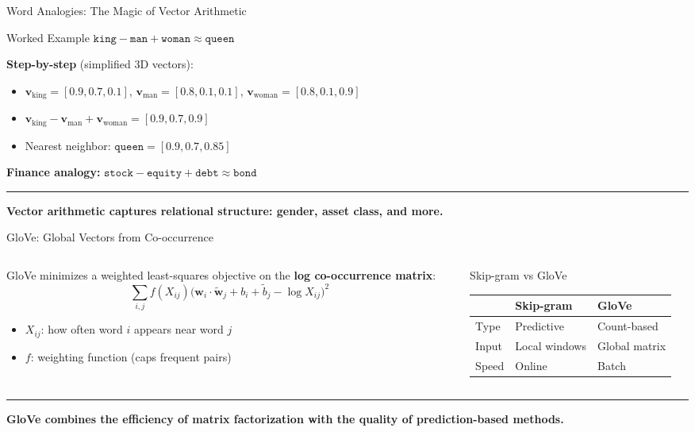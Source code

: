 \documentclass[8pt,aspectratio=169]{beamer}
\newcommand{\bottomnote}[1]{%
\vfill
\vspace{-2mm}
\textcolor{mllavender2}{\rule{\textwidth}{0.4pt}}
\vspace{1mm}
\footnotesize
\textbf{#1}
}
\newenvironment{compactlist}{%
  \begin{itemize}%
    \setlength{\itemsep}{2pt}%
    \setlength{\parskip}{0pt}%
    \setlength{\parsep}{0pt}%
}{%
  \end{itemize}%
}
\begin{document}
\begin{frame}{Word Analogies: The Magic of Vector Arithmetic}
\begin{block}{Worked Example}
$\texttt{king} - \texttt{man} + \texttt{woman} \approx \texttt{queen}$
\end{block}

\vspace{4pt}
\textbf{Step-by-step} (simplified 3D vectors):

\begin{compactlist}
  \item $\mathbf{v}_{\text{king}} = [0.9, 0.7, 0.1]$, \;
        $\mathbf{v}_{\text{man}} = [0.8, 0.1, 0.1]$, \;
        $\mathbf{v}_{\text{woman}} = [0.8, 0.1, 0.9]$
  \item $\mathbf{v}_{\text{king}} - \mathbf{v}_{\text{man}} + \mathbf{v}_{\text{woman}} = [0.9, 0.7, 0.9]$
  \item Nearest neighbor: $\texttt{queen} = [0.9, 0.7, 0.85]$ \checkmark
\end{compactlist}

\vspace{4pt}
\textbf{Finance analogy:} $\texttt{stock} - \texttt{equity} + \texttt{debt} \approx \texttt{bond}$

\bottomnote{Vector arithmetic captures relational structure: gender, asset class, and more.}
\end{frame}

\begin{frame}{GloVe: Global Vectors from Co-occurrence}
\begin{columns}[T]
\begin{column}{0.48\textwidth}
GloVe minimizes a weighted least-squares objective on the
\textbf{log co-occurrence matrix}:
\[
  \sum_{i,j} f(X_{ij})\bigl(\mathbf{w}_i \!\cdot\! \tilde{\mathbf{w}}_j + b_i + \tilde{b}_j - \log X_{ij}\bigr)^2
\]
\begin{compactlist}
  \item $X_{ij}$: how often word $i$ appears near word $j$
  \item $f$: weighting function (caps frequent pairs)
\end{compactlist}
\end{column}
\begin{column}{0.48\textwidth}
\begin{block}{Skip-gram vs GloVe}
\small
\begin{tabular}{lll}
\toprule
& \textbf{Skip-gram} & \textbf{GloVe} \\
\midrule
Type & Predictive & Count-based \\
Input & Local windows & Global matrix \\
Speed & Online & Batch \\
\bottomrule
\end{tabular}
\end{block}
\end{column}
\end{columns}

\bottomnote{GloVe combines the efficiency of matrix factorization with the quality of prediction-based methods.}
\end{frame}
\end{document}
